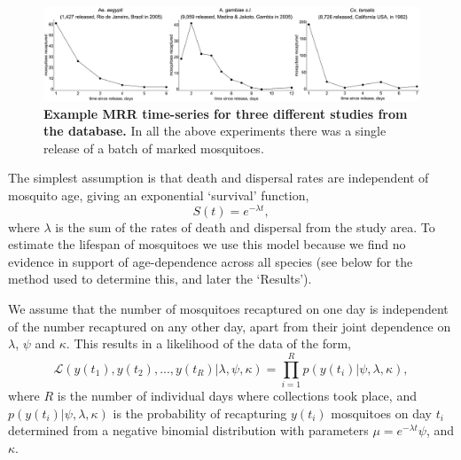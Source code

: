 \documentclass[12pt]{article}
\begin{document}
\begin{figure}[h]
	\centerline{\includegraphics[width=1.25\textwidth]{./Figure_files/mrr_exampleMRRSeries.pdf}}
	\caption{\textbf{Example MRR time-series for three different studies from the \cite{guerra2014global} database.} In all the above experiments there was a single release of a batch of marked mosquitoes.}
	\label{fig:mrr_exampleMRRSeries}
\end{figure}

The simplest assumption is that death and dispersal rates are independent of mosquito age, giving an exponential `survival' function,
%
\begin{equation}
S(t) = e^{-\lambda t},
\end{equation}
%
where $\lambda$ is the sum of the rates of death and dispersal from the study area. To estimate the lifespan of mosquitoes we use this model because we find no evidence in support of age-dependence across all species (see below for the method used to determine this, and later the `Results').

We assume that the number of mosquitoes recaptured on one day is independent of the number recaptured on any other day, apart from their joint dependence on $\lambda$, $\psi$ and $\kappa$. This results in a likelihood of the data of the form,
%
\begin{equation}
\mathcal{L}(y(t_1),y(t_2),...,y(t_R)|\lambda,\psi,\kappa) = \prod\limits_{i=1}^{R} p(y(t_i)|\psi,\lambda,\kappa),
\end{equation}
%
where $R$ is the number of individual days where collections took place, and $p(y(t_i)|\psi,\lambda,\kappa)$ is the probability of recapturing $y(t_i)$ mosquitoes on day $t_i$ determined from a negative binomial distribution with parameters $\mu = e^{-\lambda t} \psi$, and $\kappa$.
\end{document}
